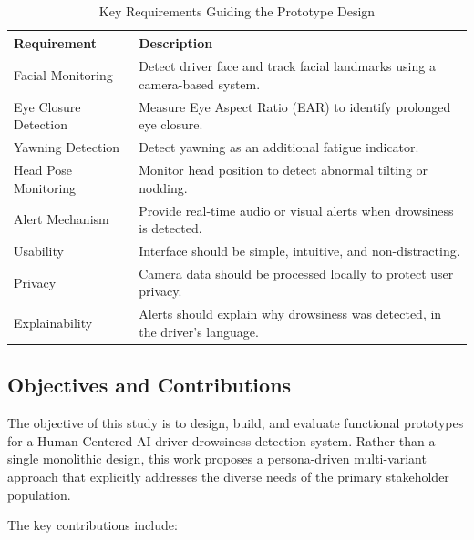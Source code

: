 \documentclass[sigconf]{acmart}
\begin{document}
\begin{table}[h]
\centering
\caption{Key Requirements Guiding the Prototype Design}
\begin{tabular}{|p{3cm}|p{5cm}|}
\hline
\textbf{Requirement} & \textbf{Description} \\
\hline
Facial Monitoring & Detect driver face and track facial landmarks using a camera-based system. \\
\hline
Eye Closure Detection & Measure Eye Aspect Ratio (EAR) to identify prolonged eye closure. \\
\hline
Yawning Detection & Detect yawning as an additional fatigue indicator. \\
\hline
Head Pose Monitoring & Monitor head position to detect abnormal tilting or nodding. \\
\hline
Alert Mechanism & Provide real-time audio or visual alerts when drowsiness is detected. \\
\hline
Usability & Interface should be simple, intuitive, and non-distracting. \\
\hline
Privacy & Camera data should be processed locally to protect user privacy. \\
\hline
Explainability & Alerts should explain why drowsiness was detected, in the driver's language. \\
\hline
\end{tabular}
\end{table}

\subsection{Objectives and Contributions}

The objective of this study is to design, build, and evaluate functional prototypes for a Human-Centered AI driver drowsiness detection system. Rather than a single monolithic design, this work proposes a persona-driven multi-variant approach that explicitly addresses the diverse needs of the primary stakeholder population.

The key contributions include:
\end{document}
